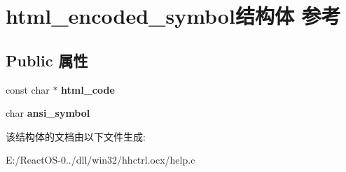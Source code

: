 \hypertarget{structhtml__encoded__symbol}{}\section{html\+\_\+encoded\+\_\+symbol结构体 参考}
\label{structhtml__encoded__symbol}
\subsection*{Public 属性}
\begin{DoxyCompactItemize}
\item 
\mbox{\label{structhtml__encoded__symbol_a49eea52d79b02549165945f9ceca3cd1}} 
const char $\ast$ {\bfseries html\+\_\+code}
\item 
\mbox{\label{structhtml__encoded__symbol_a935d1a70779f9c6c081c91e599efe101}} 
char {\bfseries ansi\+\_\+symbol}
\end{DoxyCompactItemize}


该结构体的文档由以下文件生成\+:\begin{DoxyCompactItemize}
\item 
E\+:/\+React\+O\+S-\/0../dll/win32/hhctrl.\+ocx/help.\+c\end{DoxyCompactItemize}
